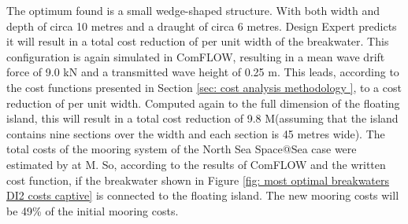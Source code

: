 The optimum found is a small wedge-shaped structure. With both width and depth of circa 10 metres and a draught of circa 6 metres. Design Expert predicts it will result in a total cost reduction of  per unit width of the breakwater. This configuration is again simulated in ComFLOW, resulting in a mean wave drift force of 9.0 kN and a transmitted wave height of 0.25 m. This leads, according to the cost functions presented in Section \ref{sec: cost analysis methodology }, to a cost reduction of  per unit width. Computed again to the full dimension of the floating island, this will result in a total cost reduction of 9.8 M\texteuro (assuming that the island contains nine sections over the width and each section is 45 metres wide). The total costs of the mooring system of the North Sea Space@Sea case were estimated by \citet{D3.3space@sea} at  M. So, according to the results of ComFLOW and the written cost function, if the breakwater shown in Figure \ref{fig:  most optimal breakwaters DI2 costs captive} is connected to the floating island. The new mooring costs will be 49\% of the initial mooring costs. 

